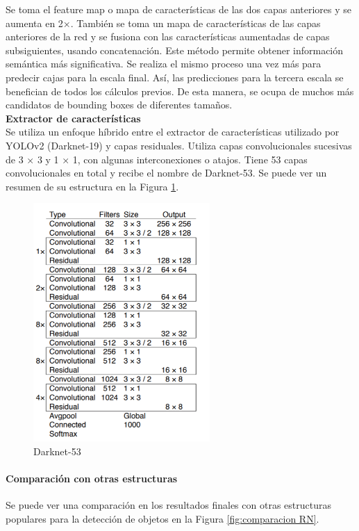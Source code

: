 Se toma el feature map o mapa de características de las dos capas anteriores y se aumenta en 2×. También se toma un mapa de características de las capas anteriores de la red y se fusiona con las características aumentadas de capas subsiguientes, usando concatenación. Este método permite obtener información semántica más significativa. Se realiza el mismo proceso una vez más para predecir cajas para la escala final. Así, las predicciones para la tercera escala se benefician de todos los cálculos previos. De esta manera, se ocupa de muchos más candidatos de bounding boxes de diferentes tamaños. \\


\textbf{Extractor de características} \\

Se utiliza un enfoque híbrido entre el extractor de características utilizado por YOLOv2 (Darknet-19) \cite{yolov2} y capas residuales. Utiliza capas convolucionales sucesivas de 3 × 3 y 1 × 1, con algunas interconexiones o atajos. Tiene 53 capas convolucionales en total y recibe el nombre de Darknet-53. Se puede ver un resumen de su estructura en la Figura \ref{fig:darknet-53}.

\begin{figure}[h!]
    \centering
    \includegraphics[width=0.6\textwidth]{img/Darknet53.png}
    \caption{Darknet-53}
    \label{fig:darknet-53}
\end{figure}

\newpage
\paragraph{Comparación con otras estructuras}
Se puede ver una comparación en los resultados finales con otras estructuras populares para la detección de objetos en la Figura \ref{fig:comparacion RN}.

